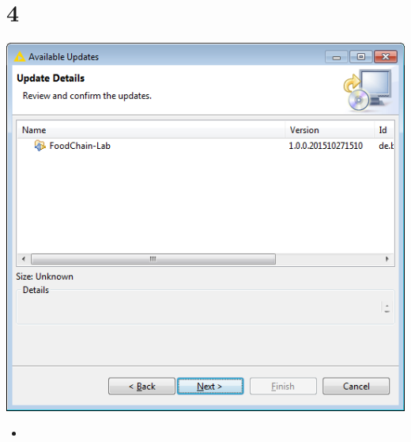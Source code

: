 \documentclass{beamer}
\begin{document}
\section{4}
\begin{frame}
	\begin{center}
  		\includegraphics[height=0.6\textheight]{4.png}
	\end{center}
	\begin{itemize}
		\item
	\end{itemize}
\end{frame}
\end{document}

